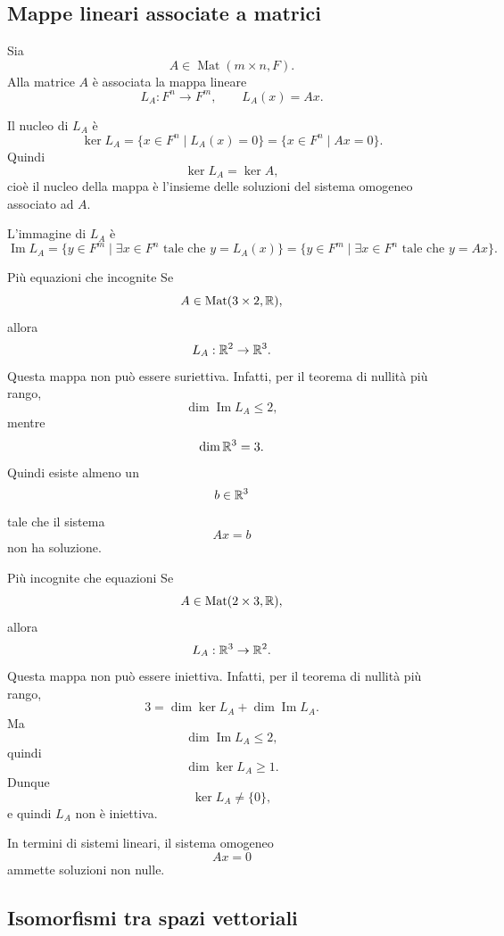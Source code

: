 \documentclass[a4paper]{article}
\begin{document}
\subsection{Mappe lineari associate a matrici}

Sia
\[
    A\in\operatorname{Mat}(m\times n,F).
\]
Alla matrice \(A\) è associata la mappa lineare
\[
    L_A:F^n\to F^m,
    \qquad
    L_A(x)=Ax.
\]

Il nucleo di \(L_A\) è
\[
    \ker L_A
    =
    \{x\in F^n\mid L_A(x)=0\}
    =
    \{x\in F^n\mid Ax=0\}.
\]
Quindi
\[
    \ker L_A=\ker A,
\]
cioè il nucleo della mappa è l'insieme delle soluzioni del sistema omogeneo associato ad \(A\).

L'immagine di \(L_A\) è
\[
    \operatorname{Im}L_A
    =
    \{y\in F^m\mid \exists x\in F^n \text{ tale che } y=L_A(x)\}
    =
    \{y\in F^m\mid \exists x\in F^n \text{ tale che } y=Ax\}.
\]

\begin{snippetexample}{Più equazioni che incognite}
    Se
    \[
        A\in\operatorname{Mat}(3\times 2,\mathbb{R}),
    \]
    allora
    \[
        L_A:\mathbb{R}^2\to\mathbb{R}^3.
    \]
    Questa mappa non può essere suriettiva. Infatti, per il teorema di nullità più rango,
    \[
        \dim\operatorname{Im}L_A\leq 2,
    \]
    mentre
    \[
        \dim\mathbb{R}^3=3.
    \]
    Quindi esiste almeno un
    \[
        b\in\mathbb{R}^3
    \]
    tale che il sistema
    \[
        Ax=b
    \]
    non ha soluzione.
\end{snippetexample}

\begin{snippetexample}{Più incognite che equazioni}
    Se
    \[
        A\in\operatorname{Mat}(2\times 3,\mathbb{R}),
    \]
    allora
    \[
        L_A:\mathbb{R}^3\to\mathbb{R}^2.
    \]
    Questa mappa non può essere iniettiva. Infatti, per il teorema di nullità più rango,
    \[
        3
        =
        \dim\ker L_A+\dim\operatorname{Im}L_A.
    \]
    Ma
    \[
        \dim\operatorname{Im}L_A\leq 2,
    \]
    quindi
    \[
        \dim\ker L_A\geq 1.
    \]
    Dunque
    \[
        \ker L_A\neq\{0\},
    \]
    e quindi \(L_A\) non è iniettiva.

    In termini di sistemi lineari, il sistema omogeneo
    \[
        Ax=0
    \]
    ammette soluzioni non nulle.
\end{snippetexample}

\subsection{Isomorfismi tra spazi vettoriali}
\end{document}
